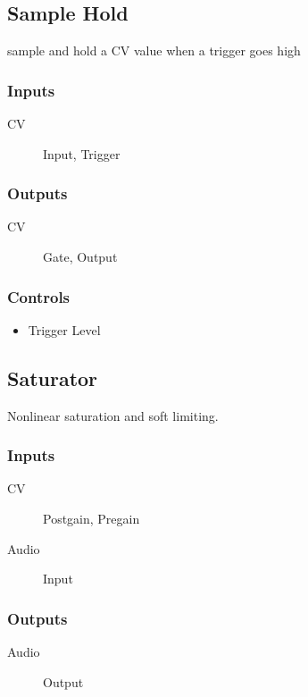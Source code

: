 \subsection{Sample Hold}

sample and hold a CV value when a trigger goes high



\subsubsection{Inputs}
\begin{description}
\item [CV] Input, Trigger
\end{description}

\subsubsection{Outputs}
\begin{description}
\item [CV] Gate, Output
\end{description}

\subsubsection{Controls}
\begin{itemize}
\item Trigger Level
\end{itemize}

\subsection{Saturator}

Nonlinear saturation and soft limiting.



\subsubsection{Inputs}
\begin{description}
\item [CV] Postgain, Pregain
\item [Audio] Input
\end{description}

\subsubsection{Outputs}
\begin{description}
\item [Audio] Output
\end{description}


